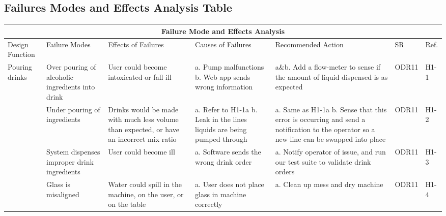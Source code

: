 \documentclass{article}
\begin{document}
    \subsection{Failures Modes and Effects Analysis Table}

    \begin{rotate}{}
    
    \begin{landscape}
        \begin{table}
           \begin{tabular}{|p{1.75cm}|p{4cm}|p{4cm}|p{4cm}|p{4cm}|p{1cm}|p{0.75cm}|}
            \hline
            \multicolumn{7}{|c|}{Failure Mode and Effects Analysis} \\
            \hline
            Design Function & Failure Modes & Effects of Failures & Causes of Failures & Recommended Action & SR & Ref.  \\ [0.5ex]
            \hline\hline
            Pouring drinks & Over pouring of alcoholic ingredients into drink & User could become intoxicated or fall ill & a. Pump malfunctions \newline b. Web app sends wrong information  & a\&b. Add a flow-meter to sense if the amount of liquid dispensed is as expected & ODR11 & H1-1 \\
            \cline{2-7}
            & Under pouring of ingredients & Drinks would be made with much less volume than expected, or have an incorrect mix ratio & a. Refer to H1-1a \newline b. Leak in the lines liquids are being pumped through & a. Same as H1-1a \newline b. Sense that this error is occurring and send a notification to the operator so a new line can be swapped into place & ODR11 & H1-2 \\
            \cline{2-7}
            & System dispenses improper drink ingredients & User could become ill & a. Software sends the wrong drink order & a. Notify operator of issue, and run our test suite to validate drink orders & ODR11 & H1-3  \\
            \cline{2-7}
                & Glass is misaligned & Water could spill in the machine, on the user, or on the table & a. User does not place glass in machine correctly & a. Clean up mess and dry machine & ODR11 & H1-4  \\

\end{tabular}
\end{table}
\end{landscape}
\end{rotate}
\end{document}
